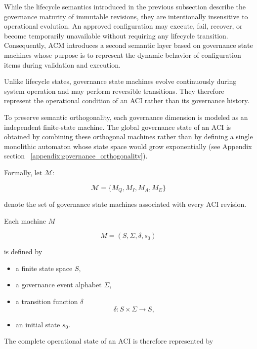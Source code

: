 \documentclass[10pt]{article}
\begin{document}
While the lifecycle semantics introduced in the previous subsection describe
the governance maturity of immutable revisions, they are intentionally
insensitive to operational evolution. An approved configuration may execute,
fail, recover, or become temporarily unavailable without requiring any
lifecycle transition. Consequently, ACM introduces a second semantic layer
based on governance state machines whose purpose is to represent the dynamic
behavior of configuration items during validation and execution.

Unlike lifecycle states, governance state machines evolve continuously during
system operation and may perform reversible transitions. They therefore
represent the operational condition of an ACI rather than its governance
history.

To preserve semantic orthogonality, each governance dimension is modeled as an
independent finite-state machine. The global governance state of an ACI is
obtained by combining these orthogonal machines rather than by defining a
single monolithic automaton whose state space would grow exponentially (see Appendix section ~\ref{appendix:governance_orthogonality}).

Formally, let $\mathcal{M}$:

\begin{equation}
\mathcal{M}
=
\{
M_Q,
M_I,
M_A,
M_E
\}
\label{eq:set_governance_aci}
\end{equation}

denote the set of governance state machines associated with every ACI
revision.

Each machine $M$

\begin{equation}
M=(S,\Sigma,\delta,s_0)
\label{eq:machine_state_transition}
\end{equation}

is defined by

\begin{itemize}
    \item a finite state space $S$,
    \item a governance event alphabet $\Sigma$,
    \item a transition function $\delta$
    \[
    \delta:S\times\Sigma\rightarrow S,
    \]
    \item an initial state $s_0$.
\end{itemize}

The complete operational state of an ACI is therefore represented by
\end{document}
